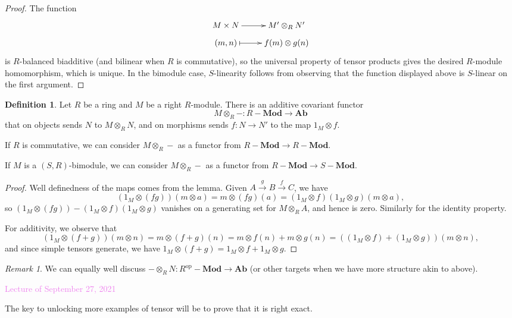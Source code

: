 \documentclass{amsart}[12pt]
\newcommand{\Sept}[1]{\textcolor{violet}{Lecture of September #1, 2021}}
\newcommand{\op}{\mathrm{op}}
\numberwithin{equation}{section}
\theoremstyle{plain} %
\theoremstyle{definition}
\newtheorem{defn}[equation]{Definition}
\theoremstyle{remark}
\newtheorem{rem}[equation]{Remark}
\newcommand{\xra}[1]{\xrightarrow{#1}}
\newcommand{\Ab}{\mathbf{Ab}}
\newcommand{\Mod}[1]{#1-\mathbf{Mod}}
\begin{document}
\begin{proof}
	The function 
	$$\xymatrix@R=2mm{M \times N \ar[r] & M' \otimes_R N'\\ (m,n) \ar@{|->}[r] & f(m) \otimes g(n)}$$
	is $R$-balanced biadditive (and bilinear when $R$ is commutative), so the universal property of tensor products gives the desired $R$-module homomorphism, which is unique. In the bimodule case, $S$-linearity follows from observing that the function displayed above is $S$-linear on the first argument.
\end{proof}



\begin{defn} Let $R$ be a ring and $M$ be a right $R$-module. There is an additive covariant functor 
\[M\otimes_R -: \Mod{R} \to \Ab\] that on objects sends $N$ to $M\otimes_R N$, and on morphisms sends $f:N\to N'$ to the map $1_M \otimes f$.

If $R$ is commutative, we can consider $M\otimes_R -$ as a functor from $\Mod{R} \to \Mod{R}$.

If $M$ is a $(S,R)$-bimodule, we can consider $M\otimes_R -$ as a functor from $\Mod{R} \to \Mod{S}$.
\end{defn}
\begin{proof}
Well definedness of the maps comes from the lemma. Given $A\xra{g} B\xra{f} C$, we have \[(1_M \otimes (fg) )(m\otimes a) = m\otimes (fg)(a) = (1_M \otimes f)(1_M \otimes g)(m\otimes a),\] so $(1_M \otimes (fg)) - (1_M \otimes f)(1_M \otimes g)$ vanishes on a generating set for $M\otimes_R A$, and hence is zero. Similarly for the identity property.

For additivity, we observe that \[(1_M \otimes (f+g))(m\otimes n) = m\otimes (f+g)(n) = m\otimes f(n) + m\otimes g(n)= ((1_M\otimes f)+(1_M \otimes g))(m\otimes n),\]
and since simple tensors generate, we have $1_M \otimes (f+g) = 1_M \otimes f + 1_M \otimes g$.
\end{proof}

\begin{rem} We can equally well discuss $- \otimes_R N : \Mod{R^\op} \to \Ab$ (or other targets when we have more structure akin to above).
\end{rem}

\Sept{27}


The key to unlocking more examples of tensor will be to prove that it is right exact.
\end{document}
